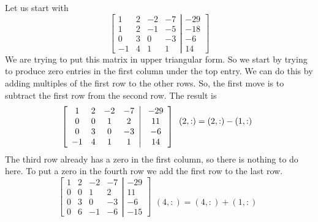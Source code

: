 \begin{example} \label{ex_gebs} Let us start with
\[
\left[
\begin{array}{cccc}
1&2&-2&-7 \\
1&2&-1&-5 \\
0&3&0&-3 \\
-1&4&1&1
\end{array} \right| \left.
\begin{array}{c}
-29 \\ -18 \\ -6 \\ 14 
\end{array}
\right]
\]
{\rm We are trying to put this matrix in upper triangular form. So we start by
trying to produce zero entries in the first column under the top entry. We
can do this by adding multiples of the first row to the other rows. So, the
first move is to subtract the first row from the second row. The
result is
\[
\left[
\begin{array}{cccc}
1&2&-2&-7 \\
0&0&1&2 \\
0&3&0&-3 \\
-1&4&1&1
\end{array} \right| \left.
\begin{array}{c}
-29 \\ 11 \\ -6 \\ 14 
\end{array}
\right]
\begin{array}{c} 
 \\ (2,:)=(2,:)-(1,:) \\ \\ \hfill
\end{array}
\]
The third row already has a zero in the first column, so there is nothing to
do here. To put a zero in the fourth row we add the first row to the
last row.
\[
\left[
\begin{array}{cccc}
1&2&-2&-7 \\
0&0&1&2 \\
0&3&0&-3 \\
0&6&-1&-6
\end{array} \right| \left.
\begin{array}{c}
-29 \\ 11 \\ -6 \\ -15 
\end{array}
\right]
\begin{array}{c} 
 \\ \\ \\ (4,:)=(4,:) +(1,:)

\end{array}\]}
\end{example}
